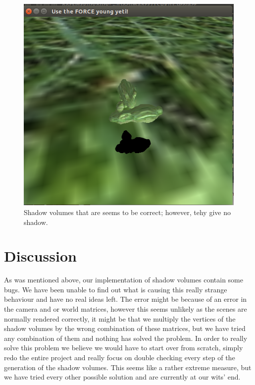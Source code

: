 \documentclass[a4paper, 12pt]{article}
\begin{document}
\begin{figure}[h]
\centering
\includegraphics[width=\textwidth]{skuggvolymer.png}
\caption{Shadow volumes that are seems to be correct; however, tehy give no shadow. }
\label{fig:shadow}
\end{figure}

 
\section{Discussion}
As was mentioned above, our implementation of shadow volumes contain some bugs. We have been unable to find out what is causing this really strange behaviour and have no real ideas left. The error might be because of an error in the camera and or world matrices, however this seems unlikely as the scenes are normally rendered correctly, it might be that we multiply the vertices of the shadow volumes by the wrong combination of these matrices, but we have tried any combination of them and nothing has solved the problem. In order to really solve this problem we believe we would have to start over from scratch, simply redo the entire project and really focus on double checking every step of the generation of the shadow volumes. This seems like a rather extreme measure, but
we have tried every other possible solution and are currently at our wits' end.
\end{document}
